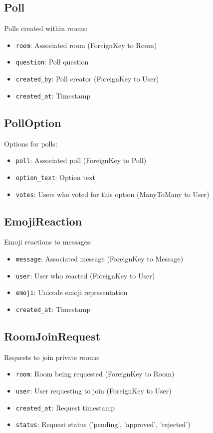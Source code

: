 \documentclass[11pt]{article}
\begin{document}
\subsection{Poll}
Polls created within rooms:
\begin{itemize}
  \item \texttt{room}: Associated room (ForeignKey to Room)
  \item \texttt{question}: Poll question
  \item \texttt{created\_by}: Poll creator (ForeignKey to User)
  \item \texttt{created\_at}: Timestamp
\end{itemize}

\subsection{PollOption}
Options for polls:
\begin{itemize}
  \item \texttt{poll}: Associated poll (ForeignKey to Poll)
  \item \texttt{option\_text}: Option text
  \item \texttt{votes}: Users who voted for this option (ManyToMany to User)
\end{itemize}

\subsection{EmojiReaction}
Emoji reactions to messages:
\begin{itemize}
  \item \texttt{message}: Associated message (ForeignKey to Message)
  \item \texttt{user}: User who reacted (ForeignKey to User)
  \item \texttt{emoji}: Unicode emoji representation
  \item \texttt{created\_at}: Timestamp
\end{itemize}

\subsection{RoomJoinRequest}
Requests to join private rooms:
\begin{itemize}
  \item \texttt{room}: Room being requested (ForeignKey to Room)
  \item \texttt{user}: User requesting to join (ForeignKey to User)
  \item \texttt{created\_at}: Request timestamp
  \item \texttt{status}: Request status ('pending', 'approved', 'rejected')
\end{itemize}
\end{document}
